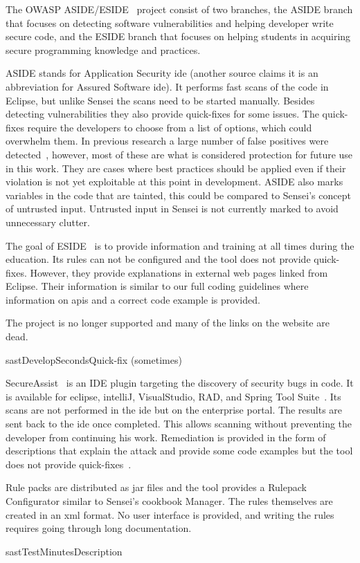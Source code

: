 {
\label{bc:ASIDE}
The OWASP ASIDE/ESIDE~\cite{aside} project consist of two branches, the ASIDE branch that focuses on detecting software vulnerabilities and helping developer write secure code, and the ESIDE branch that focuses on helping students in acquiring secure programming knowledge and practices.

ASIDE stands for Application Security \gls{ide} (another source claims it is an abbreviation for Assured Software \gls{ide}). It performs fast scans of the code in Eclipse, but unlike Sensei the scans need to be started manually.
Besides detecting vulnerabilities they also provide quick-fixes for some issues. 
The quick-fixes require the developers to choose from a list of options, which could overwhelm them.
In previous research a large number of false positives were detected~\cite{xie2011aside}, however, most of these are what is considered protection for future use in this work.
They are cases where best practices should be applied even if their violation is not yet exploitable at this point in development.
ASIDE also marks variables in the code that are tainted, this could be compared to Sensei's concept of untrusted input.
Untrusted input in Sensei is not currently marked to avoid unnecessary clutter. 

The goal of ESIDE~\cite{eside,whitney2018embedding} is to provide information and training at all times during the education. Its rules can not be configured and the tool does not provide quick-fixes. However, they provide explanations in external web pages linked from Eclipse. Their information is similar to our full coding guidelines where information on \glspl{api} and a correct code example is provided.

The project is no longer supported and many of the links on the website are dead.
}{\gls{sast}}{Develop}{Seconds}{Quick-fix (sometimes)}

{
\label{bc:SecureAssist}
SecureAssist~\cite{secureassist} is an IDE plugin targeting the discovery of security bugs in code.
It is available for eclipse, intelliJ, VisualStudio, RAD, and Spring Tool Suite~\cite{sastinide}.
Its scans are not performed in the \gls{ide} but on the enterprise portal.
The results are sent back to the \gls{ide} once completed.
This allows scanning without preventing the developer from continuing his work. Remediation is provided in the form of descriptions that explain the attack and provide some code examples but the tool does not provide quick-fixes~\cite{secureassistide}. 

Rule packs are distributed as \gls{jar} files and the tool provides a Rulepack Configurator similar to Sensei's cookbook Manager.
The rules themselves are created in an \gls{xml} format.
No user interface is provided, and writing the rules requires going through long documentation.
}{\gls{sast}}{Test}{Minutes}{Description}


